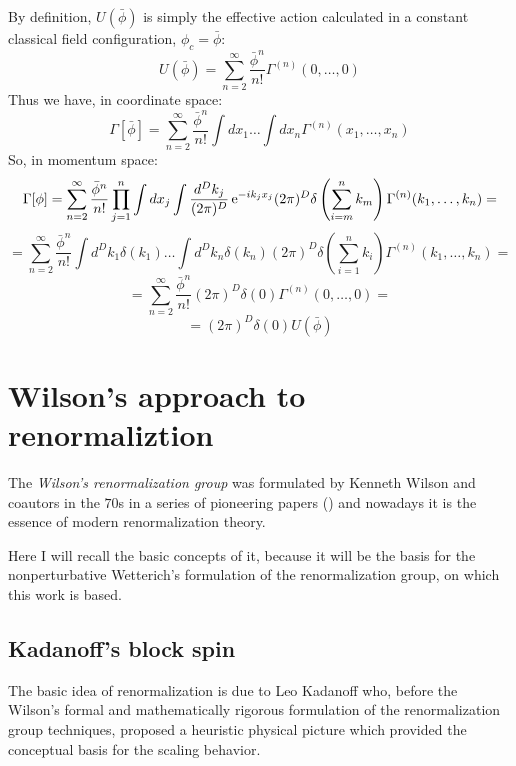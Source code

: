 By definition, $U(\bar{\phi})$ is simply the effective action calculated in a constant
classical field configuration, $\phi_c = \bar{\phi}$:
\begin{equation}
U(\bar{\phi}) = \sum_{n = 2}^{\infty}\frac{\bar{\phi}^n}{n!}   \Gamma^{(n)}(0, \dots, 0)
\end{equation}
Thus we have, in coordinate space:
\begin{equation}
\Gamma[\bar{\phi}] = \sum_{n = 2}^{\infty}\frac{\bar{\phi}^n}{n!}\int dx_1 \dots \int dx_n \Gamma^{(n)}(x_1, \dots, x_n)
\end{equation}
So, in momentum space:
\begin{equation}
 \Gamma[\phi] = \sum_{n = 2}^{\infty}\frac{\bar{\phi}^n}{n!} \prod_{j = 1}^n \int dx_j \int\frac{d^D k_j}{(2\pi)^D} \operatorname{e}^{-ik_jx_j} (2\pi)^D \delta\left(\sum_{i=m}^n k_m\right)\Gamma^{(n)}(k_1, \dots, k_n) =
\end{equation}
$$= \sum_{n = 2}^{\infty}\frac{\bar{\phi}^n}{n!} \int d^D k_1 \delta(k_1) \dots \int d^D k_n \delta(k_n)  (2\pi)^D \delta\left(\sum_{i=1}^n k_i\right)\Gamma^{(n)}(k_1, \dots, k_n) =$$
$$= \sum_{n = 2}^{\infty}\frac{\bar{\phi}^n}{n!}   (2\pi)^D \delta\left(0\right)\Gamma^{(n)}(0, \dots, 0) =$$
$$=(2\pi)^D \delta\left(0\right) U(\bar{\phi})$$

 
 
\section{Wilson's approach to renormaliztion}
The \emph{Wilson's renormalization group} was formulated by Kenneth Wilson and coautors in the $70$s in a series of  pioneering papers (\cite{wilson1}\cite{wilson2}\cite{wilson3})
and nowadays it is the essence of modern renormalization theory. 

Here I will recall the basic concepts of it, because it will be the basis for the nonperturbative Wetterich's formulation of
the renormalization group, on which this work is based.

\subsection{Kadanoff's block spin}
The basic idea of renormalization is due to Leo Kadanoff \cite{Kadanoff} who, before the Wilson's formal and mathematically rigorous formulation of the renormalization group techniques,
proposed a heuristic physical picture which provided the conceptual basis for the scaling behavior. 

